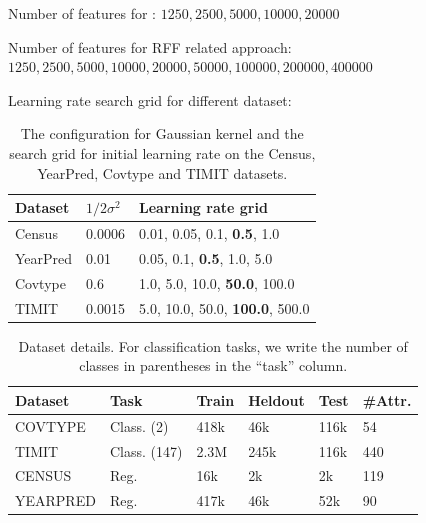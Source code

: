 Number of features for \Nystrom: $1250, 2500, 5000, 10000, 20000$

Number of features for RFF related approach: $1250, 2500, 5000, 10000, 20000, 50000, 100000, 200000, 400000$


Learning rate search grid for different dataset: 

\begin{table}
	\caption{The configuration for Gaussian kernel and the search grid for initial learning rate on the Census, YearPred, Covtype and TIMIT datasets.}
	\label{tab:hyperparam}
	\begin{center}
	\begin{tabular}{lll}
	\toprule
	Dataset & $1/2\sigma^2$ & Learning rate grid \\
	\midrule
Census & 0.0006 & {0.01, 0.05, 0.1, \textbf{0.5}, 1.0} \\
YearPred & 0.01 & {0.05, 0.1, \textbf{0.5}, 1.0, 5.0} \\
Covtype & 0.6 & {1.0, 5.0, 10.0, \textbf{50.0}, 100.0} \\
TIMIT & 0.0015 & {5.0, 10.0, 50.0, \textbf{100.0}, 500.0} \\
	\bottomrule
	\end{tabular}
	\end{center}
\end{table}

\begin{table}
	\caption{Dataset details.  For classification tasks, we write the number
		of classes in parentheses in the ``task'' column.}
	\label{tab:datasets}
	\begin{center}
		\begin{tabular}{llllll} 
			\toprule
			\textbf{Dataset}  & \textbf{Task} & \textbf{Train} & \textbf{Heldout} & \textbf{Test} & \textbf{\#Attr.} \\ 
			\midrule
			COVTYPE  & Class. (2) & 418k  & 46k     & 116k & 54  \\ 
			TIMIT    & Class. (147) & 2.3M  & 245k    & 116k & 440 \\
			CENSUS   & Reg.   & 16k   & 2k      & 2k   & 119 \\ 
			YEARPRED & Reg.   & 417k  & 46k     & 52k  & 90  \\ 
			\bottomrule
		\end{tabular}

	\end{center}
\end{table}


